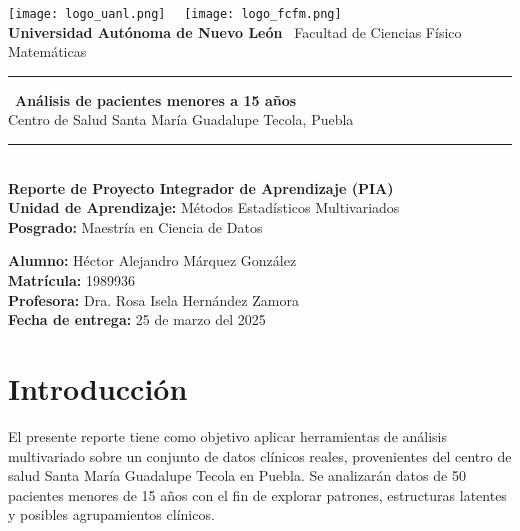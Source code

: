 \documentclass[12pt]{report}
\begin{document}
\begin{titlepage}
    \begin{center}
        \texttt{[image: logo\_uanl.png]}~\hfill~
        \texttt{[image: logo\_fcfm.png]} \\[1cm]

        {\Large \textbf{Universidad Autónoma de Nuevo León}} \
        {\large Facultad de Ciencias Físico Matemáticas} \\[1cm]

        \rule{\linewidth}{0.5mm} \
        {\LARGE \textbf{Análisis de pacientes menores a 15 años}} \\[0.4cm]
        {\large Centro de Salud Santa María Guadalupe Tecola, Puebla} \\
        \rule{\linewidth}{0.5mm} \\[1cm]

        \textbf{Reporte de Proyecto Integrador de Aprendizaje (PIA)}\\
        \textbf{Unidad de Aprendizaje:} Métodos Estadísticos Multivariados \\
        \textbf{Posgrado:} Maestría en Ciencia de Datos \\

        \vfill
        \begin{flushright}
        \textbf{Alumno:} Héctor Alejandro Márquez González\\
        \textbf{Matrícula:} 1989936\\
        \textbf{Profesora:} Dra. Rosa Isela Hernández Zamora\\
        \textbf{Fecha de entrega:} 25 de marzo del 2025
        \end{flushright}
    \end{center}
\end{titlepage}

\tableofcontents
\newpage

\chapter{Introducción}
El presente reporte tiene como objetivo aplicar herramientas de análisis multivariado sobre un conjunto de datos clínicos reales, provenientes del centro de salud Santa María Guadalupe Tecola en Puebla. Se analizarán datos de 50 pacientes menores de 15 años con el fin de explorar patrones, estructuras latentes y posibles agrupamientos clínicos.
\end{document}
